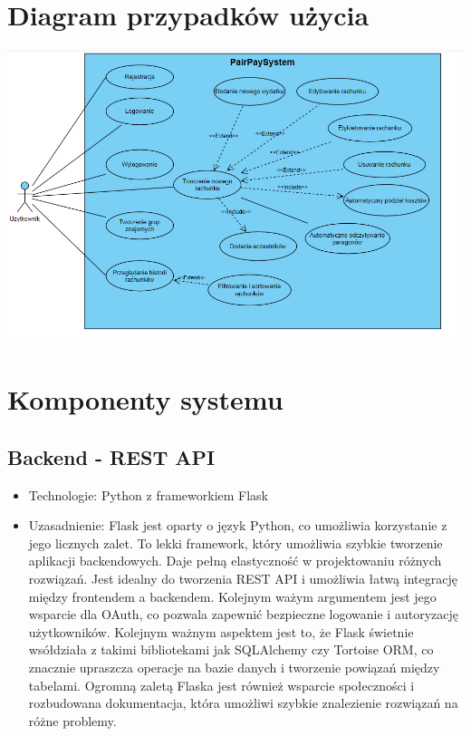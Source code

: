 \documentclass[12pt,titlepage]{article}
\begin{document}
\newpage

\section{Diagram przypadków użycia}
\includegraphics[width=1\textwidth]{UserDiagram.png}
\newpage
\section{Komponenty systemu}
\subsection{Backend - REST API}
\begin{itemize}
    \item Technologie: Python z frameworkiem Flask
    \item Uzasadnienie: Flask jest oparty o język Python, co umożliwia korzystanie z jego licznych zalet. To lekki framework, który umożliwia szybkie tworzenie aplikacji backendowych. Daje pełną elastyczność w projektowaniu różnych rozwiązań. Jest idealny do tworzenia REST API i umożliwia łatwą integrację między frontendem a backendem. Kolejnym ważym argumentem jest jego wsparcie dla OAuth, co pozwala zapewnić bezpieczne logowanie i autoryzację użytkowników. Kolejnym ważnym aspektem jest to, że Flask świetnie wsółdziała z takimi bibliotekami jak SQLAlchemy czy Tortoise ORM, co znacznie upraszcza operacje na bazie danych i tworzenie powiązań między tabelami. Ogromną zaletą Flaska jest również wsparcie społeczności i rozbudowana dokumentacja, która umożliwi szybkie znalezienie rozwiązań na różne problemy.
\end{itemize}
\end{document}
